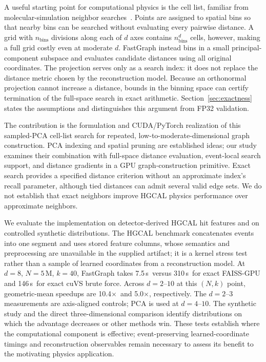 \documentclass[final,3p,11pt]{elsarticle}
\newcommand{\geoFaiss}{10.4\ensuremath{\times}}
\newcommand{\geoCuvs}{5.0\ensuremath{\times}}
\newcommand{\fgcPCADeight}{7.5\,s}
\newcommand{\faissDeight}{310\,s}
\newcommand{\cuvsBFDeight}{146\,s}
\begin{document}
A useful starting point for computational physics is the cell list,
familiar from molecular-simulation neighbor searches~\cite{verlet1967,howard2016neighbor}.
Points are assigned to spatial bins so that nearby bins can be searched
without evaluating every pairwise distance. A grid with
$n_{\text{bins}}$ divisions along each of $d$ axes contains
$n_{\text{bins}}^d$ cells, however, making a full grid costly even at
moderate $d$. FastGraph instead bins in a small principal-component
subspace and evaluates candidate distances using all original
coordinates. The projection serves only as a search index: it does not
replace the distance metric chosen by the reconstruction model.
Because an orthonormal projection cannot increase a distance, bounds
in the binning space can certify termination of the full-space search
in exact arithmetic. Section~\ref{sec:exactness} states the assumptions
and distinguishes this argument from FP32 validation.

The contribution is the formulation and CUDA/PyTorch realization of
this sampled-PCA cell-list search for repeated, low-to-moderate-dimensional
graph construction. PCA indexing and spatial pruning are established
ideas; our study examines their combination with full-space distance
evaluation, event-local search support, and distance gradients in a
GPU graph-construction primitive. Exact search provides a specified
distance criterion without an approximate index's recall parameter,
although tied distances can admit several valid edge sets. We do not
establish that exact neighbors improve HGCAL physics performance over
approximate neighbors.

We evaluate the implementation on detector-derived HGCAL hit features
and on controlled synthetic distributions. The HGCAL benchmark
concatenates events into one segment and uses stored feature columns,
whose semantics and preprocessing are unavailable in the supplied
artifact; it is a kernel stress test rather than a sample of learned
coordinates from a reconstruction model. At $d{=}8$, $N{=}5$\,M,
$k{=}40$, FastGraph takes \fgcPCADeight\ versus \faissDeight\ for
exact FAISS-GPU and \cuvsBFDeight\ for exact cuVS brute force.
Across $d{=}2$--$10$ at this $(N,k)$ point, geometric-mean speedups
are \geoFaiss\ and \geoCuvs, respectively. The $d{=}2$--$3$
measurements are axis-aligned controls; PCA is used at $d{=}4$--$10$.
The synthetic study and the direct three-dimensional comparison
identify distributions on which the advantage decreases or other
methods win. These tests establish where the computational component
is effective; event-preserving learned-coordinate timings and
reconstruction observables remain necessary to assess its benefit
to the motivating physics application.
\end{document}
